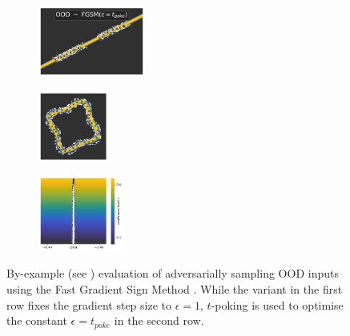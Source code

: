 \begin{figure}[H]
    \begin{subfigure}
        \centering
        \includegraphics[width=0.388\textwidth,valign=t]{ood-detection/figures/ood-synthesis/ood-line-poking-fgsm.pdf}
    \end{subfigure}
    \begin{subfigure}
        \centering
        \includegraphics[width=0.254\textwidth,valign=t]{ood-detection/figures/ood-synthesis/ood-circle-poking-fgsm.pdf}
    \end{subfigure}
    \begin{subfigure}
        \centering
        \includegraphics[width=0.308\textwidth,valign=t]{ood-detection/figures/ood-synthesis/ood-haystack-poking-fgsm.pdf}
    \end{subfigure}

    \caption[Adversarial Synthetic OOD Samples and $t$-poking]{By-example (see ) evaluation of adversarially sampling OOD inputs using the Fast Gradient Sign Method \cite{fast-gradient-2014}. While the variant in the first row fixes the gradient step size to $\epsilon = 1$, $t$-poking is used to optimise the constant $\epsilon = t_{poke}$ in the second row.}
    \label{fig:fgsm-t-poking-ood-samples}
\end{figure}

